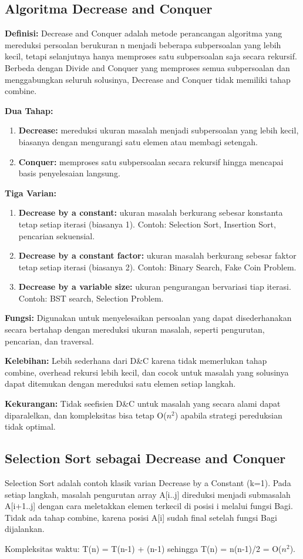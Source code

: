\subsection{Algoritma Decrease and Conquer}
\textbf{Definisi:} Decrease and Conquer adalah metode perancangan algoritma yang mereduksi persoalan berukuran n menjadi beberapa subpersoalan yang lebih kecil, tetapi selanjutnya hanya memproses satu subpersoalan saja secara rekursif. Berbeda dengan Divide and Conquer yang memproses semua subpersoalan dan menggabungkan seluruh solusinya, Decrease and Conquer tidak memiliki tahap combine.

\textbf{Dua Tahap:} 
\begin{enumerate}
    \item \textbf{Decrease:} mereduksi ukuran masalah menjadi subpersoalan yang lebih kecil, biasanya dengan mengurangi satu elemen atau membagi setengah.
    \item \textbf{Conquer:} memproses satu subpersoalan secara rekursif hingga mencapai basis penyelesaian langsung.
\end{enumerate}

\textbf{Tiga Varian:} 
\begin{enumerate}
    \item \textbf{Decrease by a constant:} ukuran masalah berkurang sebesar konstanta tetap setiap iterasi (biasanya 1). Contoh: Selection Sort, Insertion Sort, pencarian sekuensial.
    \item \textbf{Decrease by a constant factor:} ukuran masalah berkurang sebesar faktor tetap setiap iterasi (biasanya 2). Contoh: Binary Search, Fake Coin Problem.
    \item \textbf{Decrease by a variable size:} ukuran pengurangan bervariasi tiap iterasi. Contoh: BST search, Selection Problem.
\end{enumerate}

\textbf{Fungsi:} Digunakan untuk menyelesaikan persoalan yang dapat disederhanakan secara bertahap dengan mereduksi ukuran masalah, seperti pengurutan, pencarian, dan traversal.

\textbf{Kelebihan:} Lebih sederhana dari D\&C karena tidak memerlukan tahap combine, overhead rekursi lebih kecil, dan cocok untuk masalah yang solusinya dapat ditemukan dengan mereduksi satu elemen setiap langkah.

\textbf{Kekurangan:} Tidak seefisien D\&C untuk masalah yang secara alami dapat diparalelkan, dan kompleksitas bisa tetap O($n^2$) apabila strategi pereduksian tidak optimal.

\subsection{Selection Sort sebagai Decrease and Conquer}
Selection Sort adalah contoh klasik varian Decrease by a Constant (k=1). Pada setiap langkah, masalah pengurutan array A[i..j] direduksi menjadi submasalah A[i+1..j] dengan cara meletakkan elemen terkecil di posisi i melalui fungsi Bagi. Tidak ada tahap combine, karena posisi A[i] sudah final setelah fungsi Bagi dijalankan.

Kompleksitas waktu: T(n) = T(n-1) + (n-1) sehingga T(n) = n(n-1)/2 = O($n^2$).